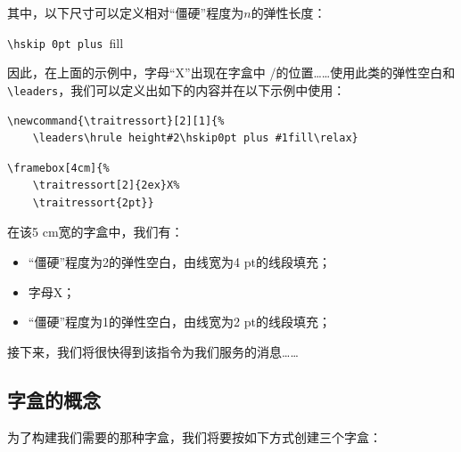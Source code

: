 其中，以下尺寸可以定义相对``僵硬''程度为$n$的弹性长度：

\begin{dmd}
\verb|\hskip 0pt plus |fill
\end{dmd}

\newcommand{\mafraction}[2]{%
\raisebox{0.5ex}{#1}%
\slash\raisebox{-0.5ex}{#2}}

因此，在上面的示例中，字母``X''出现在字盒中\mafraction{2}{5}的位置……使用此类的弹性空白和\verb|\leaders|，我们可以定义出如下的内容并在以下示例中使用：

\begin{dmd}
\begin{verbatim}
\newcommand{\traitressort}[2][1]{%
    \leaders\hrule height#2\hskip0pt plus #1fill\relax}\end{verbatim}
\end{dmd}

\begin{codelist}[10.18]{
}
\begin{verbatim}
\framebox[4cm]{%
    \traitressort[2]{2ex}X%
    \traitressort{2pt}}\end{verbatim}
\end{codelist}

在该5 cm宽的字盒中，我们有：

\begin{itemize}
    \item ``僵硬''程度为2的弹性空白，由线宽为4 pt的线段填充；
    \item 字母X；
    \item ``僵硬''程度为1的弹性空白，由线宽为2 pt的线段填充；
\end{itemize}

接下来，我们将很快得到该指令为我们服务的消息……

\subsection{字盒的概念}

为了构建我们需要的那种字盒，我们将要按如下方式创建三个字盒：

\begin{center}
    \fbox{\parbox{3pt}{%
        \rule{0pt}{1.215cm}%
        \rule{3pt}{1.025cm}}}%
    \parbox[][1.5cm][c]{4cm}{%
        \begin{flushleft}
          \\\nointerlineskip
          \\\nointerlineskip
          \framebox[4cm]{\traitressort{3pt}}
        \end{flushleft}}%
    \fbox{\parbox{3pt}{%
        \rule{0pt}{1.215cm}%
        \rule{3pt}{1.025cm}}}
\end{center}

